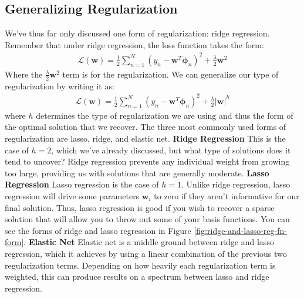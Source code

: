\subsection{Generalizing Regularization}
We've thus far only discussed one form of regularization: ridge regression. Remember that under ridge regression, the loss function takes the form:
\begin{align*}
    \mathcal{L}(\textbf{w}) = \frac{1}{2} \sum_{n=1}^{N} (y_{n} - \textbf{w}^{T}\boldsymbol{\phi}_{n})^2 + \frac{\lambda}{2}\textbf{w}^{2}
\end{align*}
Where the $\frac{\lambda}{2}\textbf{w}^{2}$ term is for the regularization. We can generalize our type of regularization by writing it as:
\begin{align*}
    \mathcal{L}(\textbf{w}) = \frac{1}{2} \sum_{n=1}^{N} (y_{n} - \textbf{w}^{T}\boldsymbol{\phi}_{n})^2 + \frac{\lambda}{2}\big|\textbf{w}\big|^{h}
\end{align*}
where $h$ determines the type of regularization we are using and thus the form of the optimal solution that we recover. The three most commonly used forms of regularization are lasso, ridge, and elastic net. \newline \newline
\textbf{Ridge Regression} \newline
This is the case of $h = 2$, which we've already discussed, but what type of solutions does it tend to uncover? Ridge regression prevents any individual weight from growing too large, providing us with solutions that are generally moderate. \newline \newline
\textbf{Lasso Regression} \newline
Lasso regression is the case of $h = 1$. Unlike ridge regression, lasso regression will drive some parameters $\textbf{w}_{i}$ to zero if they aren't informative for our final solution. Thus, lasso regression is good if you wish to recover a sparse solution that will allow you to throw out some of your basis functions. You can see the forms of ridge and lasso regression in Figure \ref{fig:ridge-and-lasso-reg-fn-form}. \newline \newline
\textbf{Elastic Net} \newline
Elastic net is a middle ground between ridge and lasso regression, which it achieves by using a linear combination of the previous two regularization terms. Depending on how heavily each regularization term is weighted, this can produce results on a spectrum between lasso and ridge regression. \\

